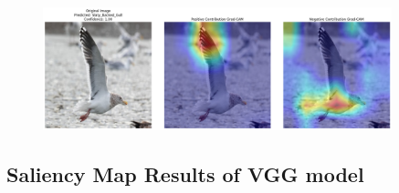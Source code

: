 \documentclass[a4paper,12pt]{report}
\begin{document}
\begin{figure}[H]
    \centering
    \includegraphics[width=0.9\textwidth]{images/appendix/vggcombined/download (11).png}
\end{figure}


\subsection{Saliency Map Results of VGG model}
\end{document}
